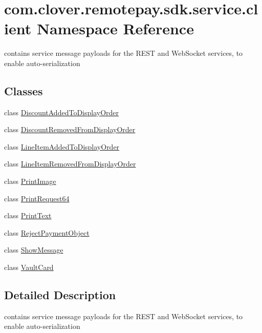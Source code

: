 \hypertarget{namespacecom_1_1clover_1_1remotepay_1_1sdk_1_1service_1_1client}{}\section{com.\+clover.\+remotepay.\+sdk.\+service.\+client Namespace Reference}
\label{namespacecom_1_1clover_1_1remotepay_1_1sdk_1_1service_1_1client}


contains service message payloads for the R\+E\+ST and Web\+Socket services, to enable auto-\/serialization  


\subsection*{Classes}
\begin{DoxyCompactItemize}
\item 
class \hyperlink{classcom_1_1clover_1_1remotepay_1_1sdk_1_1service_1_1client_1_1_discount_added_to_display_order}{Discount\+Added\+To\+Display\+Order}
\item 
class \hyperlink{classcom_1_1clover_1_1remotepay_1_1sdk_1_1service_1_1client_1_1_discount_removed_from_display_order}{Discount\+Removed\+From\+Display\+Order}
\item 
class \hyperlink{classcom_1_1clover_1_1remotepay_1_1sdk_1_1service_1_1client_1_1_line_item_added_to_display_order}{Line\+Item\+Added\+To\+Display\+Order}
\item 
class \hyperlink{classcom_1_1clover_1_1remotepay_1_1sdk_1_1service_1_1client_1_1_line_item_removed_from_display_order}{Line\+Item\+Removed\+From\+Display\+Order}
\item 
class \hyperlink{classcom_1_1clover_1_1remotepay_1_1sdk_1_1service_1_1client_1_1_print_image}{Print\+Image}
\item 
class \hyperlink{classcom_1_1clover_1_1remotepay_1_1sdk_1_1service_1_1client_1_1_print_request64}{Print\+Request64}
\item 
class \hyperlink{classcom_1_1clover_1_1remotepay_1_1sdk_1_1service_1_1client_1_1_print_text}{Print\+Text}
\item 
class \hyperlink{classcom_1_1clover_1_1remotepay_1_1sdk_1_1service_1_1client_1_1_reject_payment_object}{Reject\+Payment\+Object}
\item 
class \hyperlink{classcom_1_1clover_1_1remotepay_1_1sdk_1_1service_1_1client_1_1_show_message}{Show\+Message}
\item 
class \hyperlink{classcom_1_1clover_1_1remotepay_1_1sdk_1_1service_1_1client_1_1_vault_card}{Vault\+Card}
\end{DoxyCompactItemize}


\subsection{Detailed Description}
contains service message payloads for the R\+E\+ST and Web\+Socket services, to enable auto-\/serialization 

